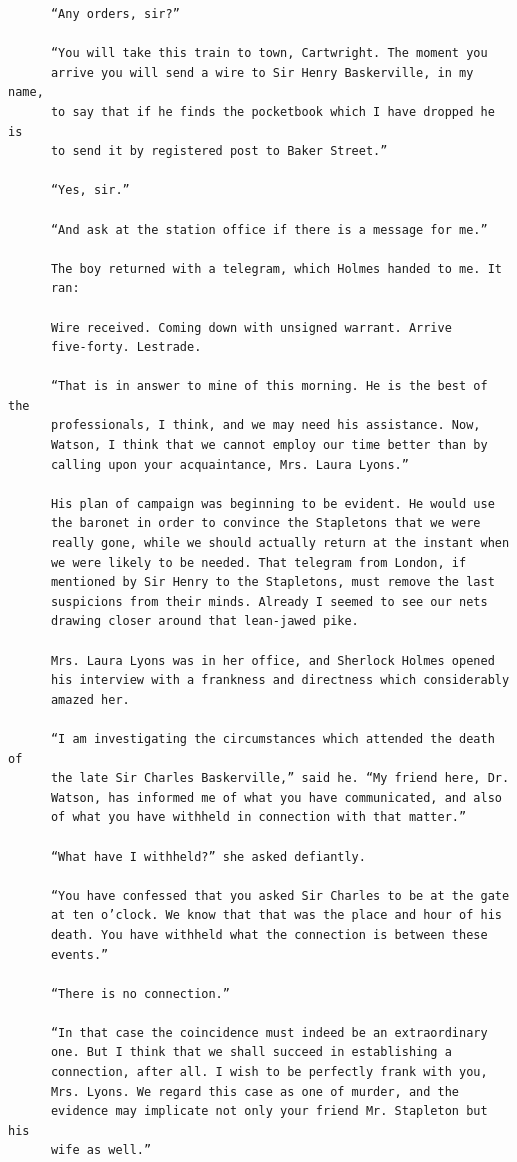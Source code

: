 \documentclass{article}
\begin{document}
\begin{verbatim}
      “Any orders, sir?”

      “You will take this train to town, Cartwright. The moment you
      arrive you will send a wire to Sir Henry Baskerville, in my name,
      to say that if he finds the pocketbook which I have dropped he is
      to send it by registered post to Baker Street.”

      “Yes, sir.”

      “And ask at the station office if there is a message for me.”

      The boy returned with a telegram, which Holmes handed to me. It
      ran:

      Wire received. Coming down with unsigned warrant. Arrive
      five-forty. Lestrade.

      “That is in answer to mine of this morning. He is the best of the
      professionals, I think, and we may need his assistance. Now,
      Watson, I think that we cannot employ our time better than by
      calling upon your acquaintance, Mrs. Laura Lyons.”

      His plan of campaign was beginning to be evident. He would use
      the baronet in order to convince the Stapletons that we were
      really gone, while we should actually return at the instant when
      we were likely to be needed. That telegram from London, if
      mentioned by Sir Henry to the Stapletons, must remove the last
      suspicions from their minds. Already I seemed to see our nets
      drawing closer around that lean-jawed pike.

      Mrs. Laura Lyons was in her office, and Sherlock Holmes opened
      his interview with a frankness and directness which considerably
      amazed her.

      “I am investigating the circumstances which attended the death of
      the late Sir Charles Baskerville,” said he. “My friend here, Dr.
      Watson, has informed me of what you have communicated, and also
      of what you have withheld in connection with that matter.”

      “What have I withheld?” she asked defiantly.

      “You have confessed that you asked Sir Charles to be at the gate
      at ten o’clock. We know that that was the place and hour of his
      death. You have withheld what the connection is between these
      events.”

      “There is no connection.”

      “In that case the coincidence must indeed be an extraordinary
      one. But I think that we shall succeed in establishing a
      connection, after all. I wish to be perfectly frank with you,
      Mrs. Lyons. We regard this case as one of murder, and the
      evidence may implicate not only your friend Mr. Stapleton but his
      wife as well.”


\end{verbatim}
\end{document}

